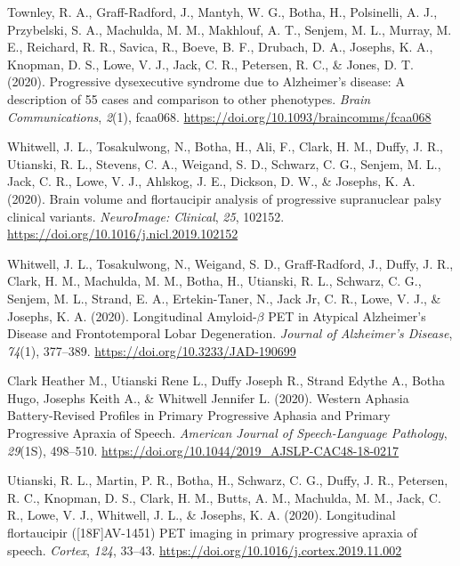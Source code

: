 \documentclass[11pt, a4paper]{awesome-cv}
\begin{document}
\leavevmode\hypertarget{ref-townley_progressive_2020}{}%
Townley, R. A., Graff-Radford, J., Mantyh, W. G., Botha, H., Polsinelli,
A. J., Przybelski, S. A., Machulda, M. M., Makhlouf, A. T., Senjem, M.
L., Murray, M. E., Reichard, R. R., Savica, R., Boeve, B. F., Drubach,
D. A., Josephs, K. A., Knopman, D. S., Lowe, V. J., Jack, C. R.,
Petersen, R. C., \& Jones, D. T. (2020). Progressive dysexecutive
syndrome due to {Alzheimer}{'}s disease: A description of 55 cases and
comparison to other phenotypes. \emph{Brain Communications},
\emph{2}(1), fcaa068. \url{https://doi.org/10.1093/braincomms/fcaa068}

\leavevmode\hypertarget{ref-whitwell_brain_2020}{}%
Whitwell, J. L., Tosakulwong, N., Botha, H., Ali, F., Clark, H. M.,
Duffy, J. R., Utianski, R. L., Stevens, C. A., Weigand, S. D., Schwarz,
C. G., Senjem, M. L., Jack, C. R., Lowe, V. J., Ahlskog, J. E., Dickson,
D. W., \& Josephs, K. A. (2020). Brain volume and flortaucipir analysis
of progressive supranuclear palsy clinical variants. \emph{NeuroImage:
Clinical}, \emph{25}, 102152.
\url{https://doi.org/10.1016/j.nicl.2019.102152}

\leavevmode\hypertarget{ref-whitwell_longitudinal_2020}{}%
Whitwell, J. L., Tosakulwong, N., Weigand, S. D., Graff-Radford, J.,
Duffy, J. R., Clark, H. M., Machulda, M. M., Botha, H., Utianski, R. L.,
Schwarz, C. G., Senjem, M. L., Strand, E. A., Ertekin-Taner, N., Jack
Jr, C. R., Lowe, V. J., \& Josephs, K. A. (2020). Longitudinal
{Amyloid}-\(\beta\) {PET} in {Atypical} {Alzheimer}{'}s {Disease} and
{Frontotemporal} {Lobar} {Degeneration}. \emph{Journal of Alzheimer's
Disease}, \emph{74}(1), 377--389.
\url{https://doi.org/10.3233/JAD-190699}

\leavevmode\hypertarget{ref-clark_heather_m_western_2020}{}%
Clark Heather M., Utianski Rene L., Duffy Joseph R., Strand Edythe A.,
Botha Hugo, Josephs Keith A., \& Whitwell Jennifer L. (2020). Western
{Aphasia} {Battery}{-}{Revised} {Profiles} in {Primary} {Progressive}
{Aphasia} and {Primary} {Progressive} {Apraxia} of {Speech}.
\emph{American Journal of Speech-Language Pathology}, \emph{29}(1S),
498--510. \url{https://doi.org/10.1044/2019_AJSLP-CAC48-18-0217}

\leavevmode\hypertarget{ref-utianski_longitudinal_2020}{}%
Utianski, R. L., Martin, P. R., Botha, H., Schwarz, C. G., Duffy, J. R.,
Petersen, R. C., Knopman, D. S., Clark, H. M., Butts, A. M., Machulda,
M. M., Jack, C. R., Lowe, V. J., Whitwell, J. L., \& Josephs, K. A.
(2020). Longitudinal flortaucipir ({[}{18F}{]}{AV}-1451) {PET} imaging
in primary progressive apraxia of speech. \emph{Cortex}, \emph{124},
33--43. \url{https://doi.org/10.1016/j.cortex.2019.11.002}
\end{document}
